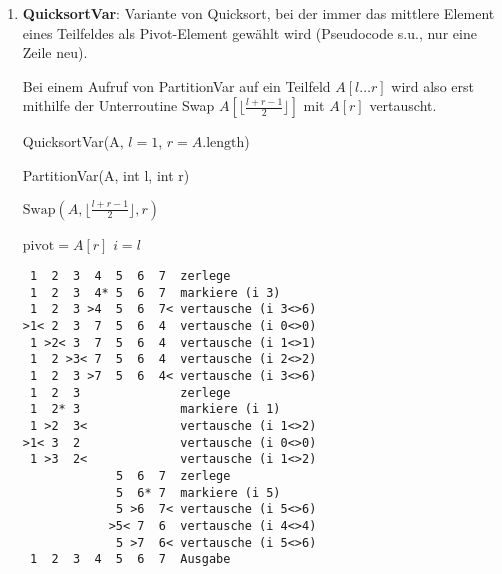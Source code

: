 \documentclass{lehramt-informatik-aufgabe}
\begin{document}
\begin{enumerate}
\begin{enumerate}

\item \textbf{QuicksortVar}: Variante von Quicksort, bei der immer das
mittlere Element eines Teilfeldes als Pivot-Element gewählt wird
(Pseudocode s.u., nur eine Zeile neu).

Bei einem Aufruf von PartitionVar auf ein Teilfeld $A[l \dots r]$ wird
also erst mithilfe der Unterroutine Swap $A\left[\lfloor \frac{l + r - 1}{2} \rfloor\right]$ mit $A[r]$
vertauscht.

\begin{function}
\caption{QuicksortVar(A, $l = 1$, $r = A.\text{length}$)}

\end{function}

\begin{function}
\caption{PartitionVar(A, int l, int r)}

$\text{Swap}(A, \lfloor \frac{l + r - 1}{2} \rfloor, r)$\;

$\text{pivot} = A[r]$\;
$i = l$\;
\end{function}

\begin{liAntwort}


\begin{verbatim}
 1  2  3  4  5  6  7  zerlege
 1  2  3  4* 5  6  7  markiere (i 3)
 1  2  3 >4  5  6  7< vertausche (i 3<>6)
>1< 2  3  7  5  6  4  vertausche (i 0<>0)
 1 >2< 3  7  5  6  4  vertausche (i 1<>1)
 1  2 >3< 7  5  6  4  vertausche (i 2<>2)
 1  2  3 >7  5  6  4< vertausche (i 3<>6)
 1  2  3              zerlege
 1  2* 3              markiere (i 1)
 1 >2  3<             vertausche (i 1<>2)
>1< 3  2              vertausche (i 0<>0)
 1 >3  2<             vertausche (i 1<>2)
             5  6  7  zerlege
             5  6* 7  markiere (i 5)
             5 >6  7< vertausche (i 5<>6)
            >5< 7  6  vertausche (i 4<>4)
             5 >7  6< vertausche (i 5<>6)
 1  2  3  4  5  6  7  Ausgabe
\end{verbatim}



\end{liAntwort}
\end{enumerate}
\end{enumerate}
\end{document}
